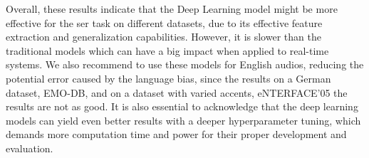 Overall, these results indicate that the Deep Learning model might be more effective for the \ac{ser} task on different datasets, due to its effective feature extraction and generalization capabilities. However, it is slower than the traditional models which can have a big impact when applied to real-time systems. We also recommend to use these models for English audios, reducing the potential error caused by the language bias, since the results on a German dataset, EMO-DB, and on a dataset with varied accents, eNTERFACE'05 the results are not as good. It is also essential to acknowledge that the deep learning models can yield even better results with a deeper hyperparameter tuning, which demands more computation time and power for their proper  development and evaluation.


\begin{table}[H]
	\centering
	\caption{Final models trained on \ac{iemo} and evaluated on different datasets.}
	\label{final_models}
\end{table}


